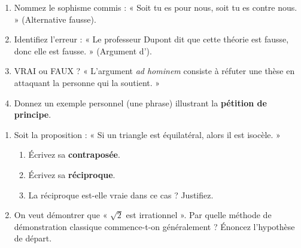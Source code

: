 \documentclass[11pt]{article}
\begin{document}
\begin{exercice}
\begin{enumerate}
    \item Nommez le sophisme commis : « Soit tu es pour nous, soit tu es contre nous. » (Alternative fausse).
    \item Identifiez l'erreur : « Le professeur Dupont dit que cette théorie est fausse, donc elle est fausse. » (Argument d'\underline{\hspace{3cm}}).
    \item VRAI ou FAUX ? « L'argument \textit{ad hominem} consiste à réfuter une thèse en attaquant la personne qui la soutient. »
    \item Donnez un exemple personnel (une phrase) illustrant la \textbf{pétition de principe}.
\end{enumerate}
\end{exercice}

\begin{exercice}
\begin{enumerate}
    \item Soit la proposition : « Si un triangle est équilatéral, alors il est isocèle. »
    \begin{enumerate}
        \item Écrivez sa \textbf{contraposée}.
        \item Écrivez sa \textbf{réciproque}.
        \item La réciproque est-elle vraie dans ce cas ? Justifiez.
    \end{enumerate}
    \item On veut démontrer que « $\sqrt{2}$ est irrationnel ». Par quelle méthode de démonstration classique commence-t-on généralement ? Énoncez l'hypothèse de départ.
\end{enumerate}
\end{exercice}
\end{document}
